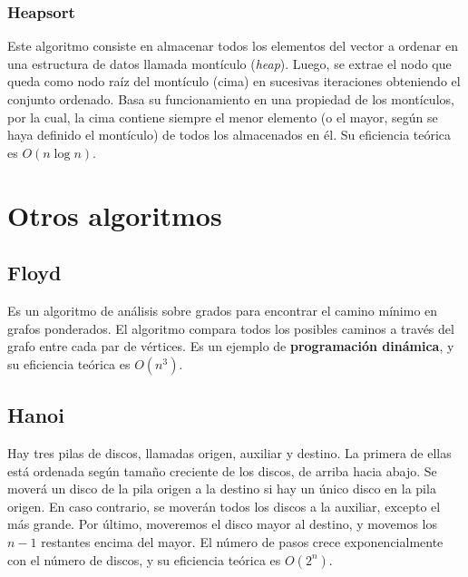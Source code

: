 \documentclass[11pt]{article}
\begin{document}
\subsubsection*{Heapsort}
Este algoritmo consiste en almacenar todos los elementos del vector a ordenar en una estructura de datos llamada montículo (\textit{heap}). Luego, se extrae el nodo que queda como nodo raíz del montículo (cima) en sucesivas iteraciones obteniendo el conjunto ordenado. Basa su funcionamiento en una propiedad de los montículos, por la cual, la cima contiene siempre el menor elemento (o el mayor, según se haya definido el montículo) de todos los almacenados en él. Su eficiencia teórica es $O(n\log n)$.
\begin{center}
	
\end{center}

\section*{Otros algoritmos}

\subsection*{Floyd}
Es un algoritmo de análisis sobre grados para encontrar el camino mínimo en grafos ponderados. El algoritmo compara todos los posibles caminos a través del grafo entre cada par de vértices. Es un ejemplo de \textbf{programación dinámica}, y su eficiencia teórica es $O(n^3)$.

\begin{center}
	
\end{center}

\subsection*{Hanoi}
Hay tres pilas de discos, llamadas origen, auxiliar y destino. La primera de ellas está ordenada según tamaño creciente de los discos, de arriba hacia abajo. Se moverá un disco de la pila origen a la destino si hay un único disco en la pila origen. En caso contrario, se moverán todos los discos a la auxiliar, excepto el más grande. Por último, moveremos el disco mayor al destino, y movemos los $n-1$ restantes encima del mayor. El número de pasos crece exponencialmente con el número de discos, y su eficiencia teórica es $O(2^n)$.

\begin{center}
	
\end{center}
\end{document}
